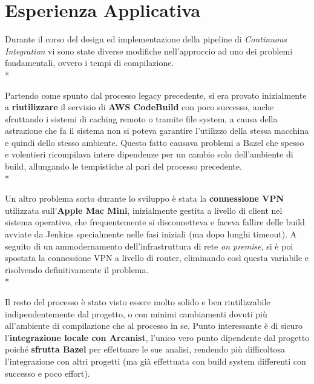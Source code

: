 \documentclass[../main.tex]{subfiles}
\begin{document}
        \section{Esperienza Applicativa}

            Durante il corso del design ed implementazione della pipeline di \emph{Continuous Integration} vi sono state diverse modifiche nell'approccio ad uno dei problemi fondamentali, ovvero i tempi di compilazione.\\*
            
            Partendo come spunto dal processo legacy precedente, si era provato inizialmente a \textbf{riutilizzare} il servizio di \textbf{AWS CodeBuild} con poco successo, anche sfruttando i sistemi di caching remoto o tramite file system, a causa della astrazione che fa il sistema non si poteva garantire l'utilizzo della stessa macchina e quindi dello stesso ambiente. Questo fatto causava problemi a Bazel che spesso e volentieri ricompilava intere dipendenze per un cambio solo dell'ambiente di build, allungando le tempistiche al pari del processo precedente.\\*
            
            Un altro problema sorto durante lo sviluppo è stata la \textbf{connessione VPN} utilizzata sull'\textbf{Apple Mac Mini}, inizialmente gestita a livello di client nel sistema operativo, che frequentemente si disconnetteva e faceva fallire delle build avviate da Jenkins specialmente nelle fasi iniziali (ma dopo lunghi timeout). A seguito di un ammodernamento dell'infrastruttura di rete \emph{on premise}, si è poi spostata la connessione VPN a livello di router, eliminando così questa variabile e risolvendo definitivamente il problema.\\*
            
            Il resto del processo è stato visto essere molto solido e ben riutilizzabile indipendentemente dal progetto, o con minimi cambiamenti dovuti più all'ambiente di compilazione che al processo in se. Punto interessante è di sicuro l'\textbf{integrazione locale con Arcanist}, l'unico vero punto dipendente dal progetto poiché \textbf{sfrutta Bazel} per effettuare le sue analisi, rendendo più difficoltosa l'integrazione con altri progetti (ma già effettuata con build system differenti con successo e poco effort).
\end{document}
